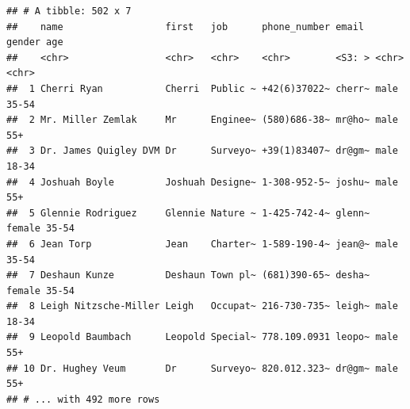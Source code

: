 \documentclass[]{book}
\begin{document}
\begin{verbatim}
## # A tibble: 502 x 7
##    name                  first   job      phone_number email  gender age  
##    <chr>                 <chr>   <chr>    <chr>        <S3: > <chr>  <chr>
##  1 Cherri Ryan           Cherri  Public ~ +42(6)37022~ cherr~ male   35-54
##  2 Mr. Miller Zemlak     Mr      Enginee~ (580)686-38~ mr@ho~ male   55+  
##  3 Dr. James Quigley DVM Dr      Surveyo~ +39(1)83407~ dr@gm~ male   18-34
##  4 Joshuah Boyle         Joshuah Designe~ 1-308-952-5~ joshu~ male   55+  
##  5 Glennie Rodriguez     Glennie Nature ~ 1-425-742-4~ glenn~ female 35-54
##  6 Jean Torp             Jean    Charter~ 1-589-190-4~ jean@~ male   35-54
##  7 Deshaun Kunze         Deshaun Town pl~ (681)390-65~ desha~ female 35-54
##  8 Leigh Nitzsche-Miller Leigh   Occupat~ 216-730-735~ leigh~ male   18-34
##  9 Leopold Baumbach      Leopold Special~ 778.109.0931 leopo~ male   55+  
## 10 Dr. Hughey Veum       Dr      Surveyo~ 820.012.323~ dr@gm~ male   55+  
## # ... with 492 more rows
\end{verbatim}


\end{document}
